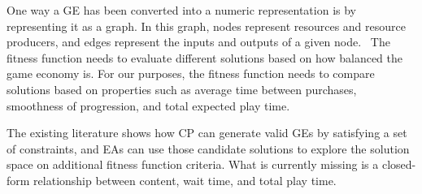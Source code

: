 One way a GE has been converted into a numeric representation is by representing it as a graph.
In this graph, nodes represent resources and resource producers, and edges represent the inputs and outputs of a given node.~\cite{rogers_using_2023}
The fitness function needs to evaluate different solutions based on how balanced the game economy is.
For our purposes, the fitness function needs to compare solutions based on properties such as average time between purchases, smoothness of progression, and total expected play time.

The existing literature shows how CP can generate valid GEs by satisfying a set of constraints,
and EAs can use those candidate solutions to explore the solution space on additional fitness function criteria.
What is currently missing is a closed-form relationship between content, wait time, and total play time.